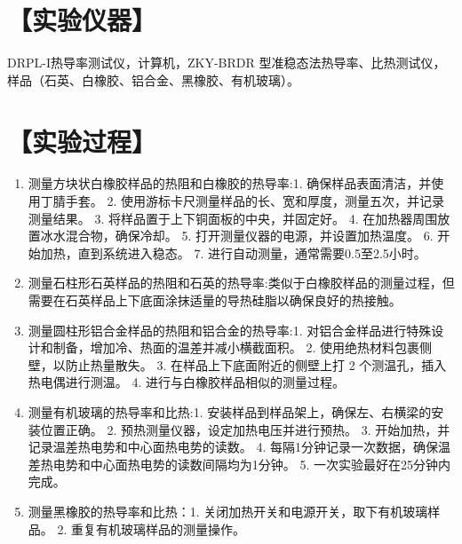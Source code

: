 \documentclass[a4paper,utf8]{article}
\begin{document}
\section*{【实验仪器】}%
    DRPL-I热导率测试仪，计算机，ZKY-BRDR 型准稳态法热导率、比热测试仪，样品（石英、白橡胶、铝合金、黑橡胶、有机玻璃）。
\section*{【实验过程】}%
    \begin{enumerate}
        \item 测量方块状白橡胶样品的热阻和白橡胶的热导率:1. 确保样品表面清洁，并使用丁腈手套。
        2. 使用游标卡尺测量样品的长、宽和厚度，测量五次，并记录测量结果。
        3. 将样品置于上下铜面板的中央，并固定好。
        4. 在加热器周围放置冰水混合物，确保冷却。
        5. 打开测量仪器的电源，并设置加热温度。
        6. 开始加热，直到系统进入稳态。
        7. 进行自动测量，通常需要0.5至2.5小时。
        \item 测量石柱形石英样品的热阻和石英的热导率:类似于白橡胶样品的测量过程，但需要在石英样品上下底面涂抹适量的导热硅脂以确保良好的热接触。
        \item 测量圆柱形铝合金样品的热阻和铝合金的热导率:1. 对铝合金样品进行特殊设计和制备，增加冷、热面的温差并减小横截面积。
        2. 使用绝热材料包裹侧壁，以防止热量散失。
        3. 在样品上下底面附近的侧壁上打 2 个测温孔，插入热电偶进行测温。
        4. 进行与白橡胶样品相似的测量过程。
        \item 测量有机玻璃的热导率和比热:1. 安装样品到样品架上，确保左、右横梁的安装位置正确。
        2. 预热测量仪器，设定加热电压并进行预热。
        3. 开始加热，并记录温差热电势和中心面热电势的读数。
        4. 每隔1分钟记录一次数据，确保温差热电势和中心面热电势的读数间隔均为1分钟。
        5. 一次实验最好在25分钟内完成。
        \item 测量黑橡胶的热导率和比热：1. 关闭加热开关和电源开关，取下有机玻璃样品。
        2. 重复有机玻璃样品的测量操作。
    \end{enumerate}
\end{document}
